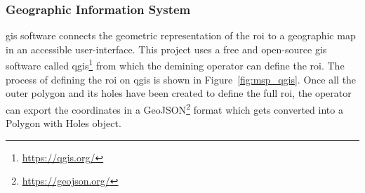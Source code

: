 \subsubsection{Geographic Information System}

\gls{gis} software connects the geometric representation of the \gls{roi} to a geographic map in an accessible user-interface. This project uses a free and open-source \gls{gis} software called \gls{qgis}\footnote{\url{https://qgis.org/}} from which the demining operator can define the \gls{roi}. The process of defining the \gls{roi} on \gls{qgis} is shown in Figure~\ref{fig:msp_qgis}. Once all the outer polygon and its holes have been created to define the full \gls{roi}, the operator can export the coordinates in a GeoJSON\footnote{\url{https://geojson.org/}} format which gets converted into a Polygon with Holes object.

